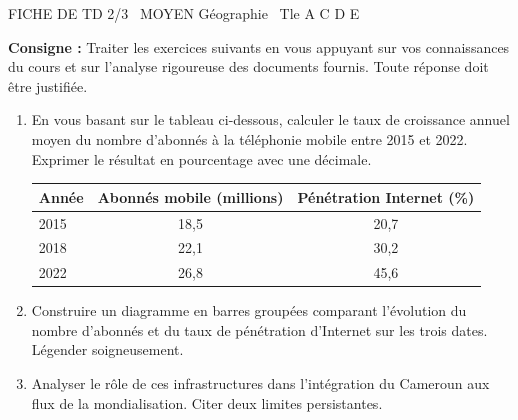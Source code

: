 \documentclass[11pt]{article}
\begin{document}
\begin{tcolorbox}[enhanced,colback=popink,colframe=popink,arc=10pt,boxrule=0pt,left=12pt,right=12pt,top=9pt,bottom=9pt]
{\color{white}\popxbold\small FICHE DE TD 2/3 \textbullet\ MOYEN \hfill Géographie \textbullet\ Tle A C D E\par}
\end{tcolorbox}
\vspace{4pt}
\noindent \textbf{Consigne :} Traiter les exercices suivants en vous appuyant sur vos connaissances du cours et sur l'analyse rigoureuse des documents fournis. Toute réponse doit être justifiée.

\begin{exercice}
\begin{enumerate}
    \item En vous basant sur le tableau ci-dessous, calculer le taux de croissance annuel moyen du nombre d'abonnés à la téléphonie mobile entre 2015 et 2022. Exprimer le résultat en pourcentage avec une décimale.
    
    \begin{tabular}{lcc}
        \hline
        \textbf{Année} & \textbf{Abonnés mobile (millions)} & \textbf{Pénétration Internet (\%)} \\
        \hline
        2015 & 18,5 & 20,7 \\
        2018 & 22,1 & 30,2 \\
        2022 & 26,8 & 45,6 \\
        \hline
    \end{tabular}
    
    \item Construire un diagramme en barres groupées comparant l'évolution du nombre d'abonnés et du taux de pénétration d'Internet sur les trois dates. Légender soigneusement.
    \item Analyser le rôle de ces infrastructures dans l'intégration du Cameroun aux flux de la mondialisation. Citer deux limites persistantes.
\end{enumerate}
\end{exercice}
\end{document}
